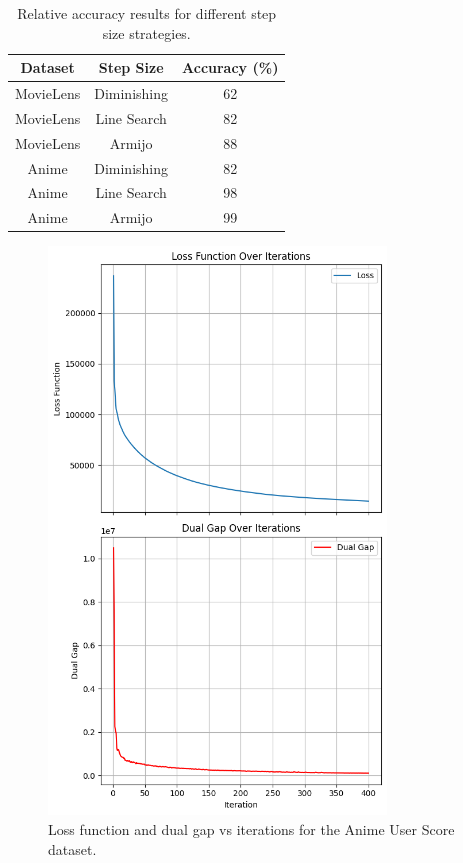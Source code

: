 \documentclass[a4paper, 11pt, reqno]{article} %
\begin{document}
\begin{multicols}{2}
\begin{table}[H]
    \centering
    \begin{tabular}{|c|c|c|}
        \hline
        \textbf{Dataset} & \textbf{Step Size} & \textbf{ Accuracy (\%)} \\ \hline
        MovieLens & Diminishing & 62 \\ \hline
        MovieLens & Line Search & 82 \\ \hline
        MovieLens & Armijo & 88 \\ \hline
        Anime & Diminishing & 82 \\ \hline
        Anime & Line Search & 98 \\ \hline
        Anime & Armijo & 99 \\ \hline
    \end{tabular}
    \caption{Relative accuracy results for different step size strategies.}
\end{table}

\begin{figure}[H]
    \centering
    \includegraphics[width=0.8\textwidth]{images/anime_loss_gap}
    \caption{Loss function and dual gap vs iterations for the Anime User Score dataset.}
    \label{fig:anime}
\end{figure}


\end{multicols}
\end{document}
